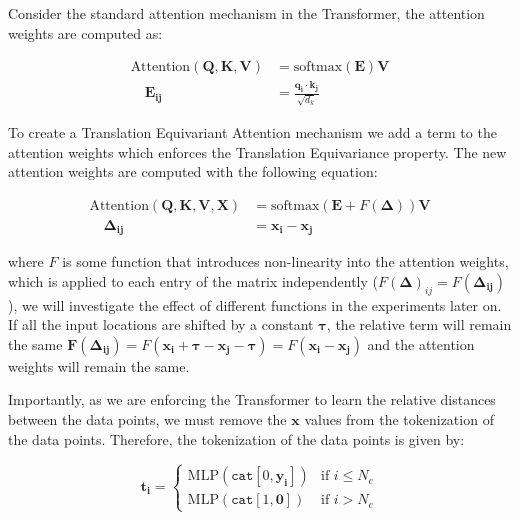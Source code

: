 \documentclass[../../main.tex]{subfiles}
\begin{document}
Consider the standard attention mechanism in the Transformer, the attention weights are computed as:


\begin{align}
	\text{Attention}(\bm{Q}, \bm{K}, \bm{V}) &= \text{softmax}\left(\bm{E} \right) \bm{V}\\
	 \quad \bm{E_{ij}} &= \frac{\bm{q_i} \cdot \bm{k_j}}{\sqrt{d_k}}
\end{align}

To create a Translation Equivariant Attention mechanism we add a term to the attention weights which enforces the Translation Equivariance property. The new attention weights are computed with the following equation:

\begin{align}
	\label{eq:relative-attention}
	\text{Attention}(\bm{Q}, \bm{K}, \bm{V}, \bm{X}) &= \text{softmax}\left(\bm{E} + F(\bm{\Delta}) \right) \bm{V}\\
	 \quad \bm{\Delta_{ij}} &= \bm{x_i} - \bm{x_j}
\end{align}

where $F$ is some function that introduces non-linearity into the attention weights, which is applied to each entry of the matrix independently ($F(\bm{\Delta})_{ij} = F(\bm{\Delta_{ij}})$), we will investigate the effect of different functions in the experiments later on. If all the input locations are shifted by a constant $\bm{\tau}$, the relative term will remain the same $\bm{F(\Delta_{ij})} = F(\bm{x_i} + \bm{\tau} - \bm{x_j} - \bm{\tau}) = F(\bm{x_i} - \bm{x_j})$ and the attention weights will remain the same.

Importantly, as we are enforcing the Transformer to learn the relative distances between the data points, we must remove the $\bm{x}$ values from the tokenization of the data points. Therefore, the tokenization of the data points is given by:

\[
	\bm{t_i} = \begin{cases}
		\text{MLP}(\texttt{cat}[0, \bm{y_i}]) & \text{if } i \leq N_c \\
		\text{MLP}(\texttt{cat}[1, \bm{ 0}]) & \text{if } i > N_c
	\end{cases}
\]


\end{document}
